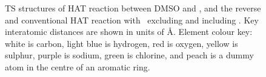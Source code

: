\begin{figure}
  \caption[TS structures of HAT reaction between DMSO and \cumo, and the reverse and conventional HAT reaction with \bno\ excluding and including .]{TS structures of HAT reaction between DMSO and \cumo, and the reverse and conventional HAT reaction with \bno\ excluding and including . Key interatomic distances are shown in units of \AA. Element colour key: white is carbon, light blue is hydrogen, red is oxygen, yellow is sulphur, purple is sodium, green is chlorine, and peach is a dummy atom in the centre of an aromatic ring.}
  \label{fig:dmso-bno-ts}
\end{figure}
